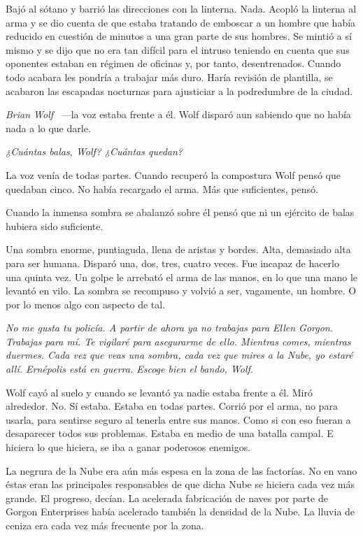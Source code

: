 Bajó al sótano y barrió las direcciones con la linterna. Nada. Acopló la linterna al arma y se dio cuenta de que estaba tratando de emboscar a un hombre que había reducido en cuestión de minutos a una gran parte de sus hombres. Se mintió a sí mismo y se dijo que no era tan difícil para el intruso teniendo en cuenta que sus oponentes estaban en régimen de oficinas y, por tanto, desentrenados. Cuando todo acabara les pondría a trabajar más duro. Haría revisión de plantilla, se acabaron las escapadas nocturnas para ajusticiar a la podredumbre de la ciudad.

\emph{Brian Wolf} ~---la voz estaba frente a él. Wolf disparó aun sabiendo que no había nada a lo que darle.

\emph{¿Cuántas balas, Wolf? ¿Cuántas quedan?}

La voz venía de todas partes. Cuando recuperó la compostura Wolf pensó que quedaban cinco. No había recargado el arma. Más que suficientes, pensó.

Cuando la inmensa sombra se abalanzó sobre él pensó que ni un ejército de balas hubiera sido suficiente.

Una sombra enorme, puntiaguda, llena de aristas y bordes. Alta, demasiado alta para ser humana. Disparó una, dos, tres, cuatro veces. Fue incapaz de hacerlo una quinta vez. Un golpe le arrebató el arma de las manos, en lo que una mano le levantó en vilo. La sombra se recompuso y volvió a ser, vagamente, un hombre. O por lo menos algo con aspecto de tal.

\emph{No me gusta tu policía. A partir de ahora ya no trabajas para Ellen Gorgon. Trabajas para mí. Te vigilaré para asegurarme de ello. Mientras comes, mientras duermes. Cada vez que veas una sombra, cada vez que mires a la Nube, yo estaré allí. Ernépolis está en guerra. Escoge bien el bando, Wolf.}

Wolf cayó al suelo y cuando se levantó ya nadie estaba frente a él. Miró alrededor. No. Sí estaba. Estaba en todas partes. Corrió por el arma, no para usarla, para sentirse seguro al tenerla entre sus manos. Como si con eso fueran a desaparecer todos sus problemas. Estaba en medio de una batalla campal. E hiciera lo que hiciera, se iba a ganar poderosos enemigos.

\bigskip\noindent
La negrura de la Nube era aún más espesa en la zona de las factorías. No en vano éstas eran las principales responsables de que dicha Nube se hiciera cada vez más grande. El progreso, decían. La acelerada fabricación de naves por parte de Gorgon Enterprises había acelerado también la densidad de la Nube. La lluvia de ceniza era cada vez más frecuente por la zona.

